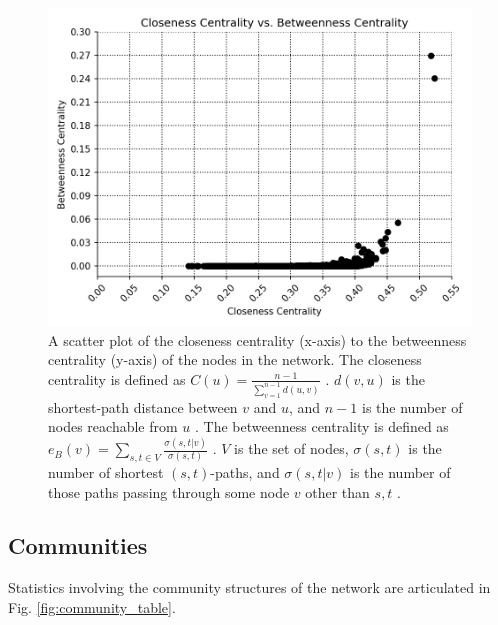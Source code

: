 \documentclass[9pt,twocolumn,twoside]{pnas-new}
\begin{document}
\begin{figure}
\centering
\includegraphics[width=.8\linewidth]{centralities}
\caption{A scatter plot of the closeness centrality (x-axis) to the betweenness centrality (y-axis) of the nodes in the network. The closeness centrality is defined as $C(u) =\frac{n-1}{\sum_{v=1}^{n-1}d(u, v)}$ \cite{networkxclosenesscentrality}. $d(v, u)$ is the shortest-path distance between $v$ and $u$, and $n-1$ is the number of nodes reachable from $u$ \cite{networkxclosenesscentrality}. The betweenness centrality is defined as $e_{B}(v)=\sum_{s,t\in V}^{}\frac{\sigma(s, t|v)}{\sigma(s, t)}$ \cite{networkxbetweennesscentrality}. $V$ is the set of nodes, $\sigma(s, t)$ is the number of shortest $(s, t)$-paths, and $\sigma(s, t|v)$ is the number of those paths passing through some node $v$ other than $s, t$ \cite{networkxbetweennesscentrality}.
}
\label{fig:centralities}
\end{figure}

\subsection{Communities} Statistics involving the community structures of the network are articulated in Fig. \ref{fig:community_table}.
\end{document}
